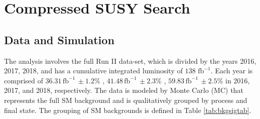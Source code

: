 
\setcounter{secnumdepth}{3}
\setcounter{tocdepth}{3}
\setlength{\parskip}{\smallskipamount}
\setlength{\parindent}{0pt}


\makeatletter


\providecommand{\tabularnewline}{\\}


\makeatother

%

\chapter{Compressed SUSY Search}


\section{ Data and Simulation}
The analysis involves the full Run II data-set, which is divided by the years 2016, 2017, 2018, and has a cumulative integrated luminosity of $138 \, \, \text{fb}^{-1}$. Each year is comprised of $36.31 \, \text{fb}^{-1} \, \pm 1.2\%$ \cite{CMS:2021xjt}, $41.48 \, \text{fb}^{-1} \, \pm 2.3\%$ \cite{CMS:2018elu}, $59.83 \, \text{fb}^{-1} \, \pm2.5\%$ \cite{CMS:2019jhq} in 2016, 2017, and 2018, respectively. The data is modeled by Monte Carlo (MC) that represents the full SM background and is qualitatively grouped by process and final state. The grouping of SM backgrounds is defined in Table \ref{tab:bkgsigtab}.

